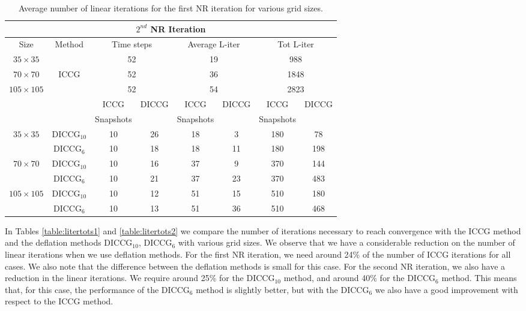 \documentclass[12pt]{article}
\begin{document}
\begin{table}[!h]\centering
\begin{minipage}{1\textwidth}
\vspace{-10pt}
\centering
\begin{tabular}{ |c|c|c|c|c|c|c|c|} 
  \hline
 \multicolumn{8}{|c|}{$2^{nd}$ NR Iteration}  \\
\hline
Size&Method&  \multicolumn{2}{|c|}{Time steps} &\multicolumn{2}{|c|}{Average L-iter} & \multicolumn{2}{|c|}{Tot L-iter}\\
\hline
$35\times35$& &\multicolumn{2}{|c|}{52} & \multicolumn{2}{|c|}{19}& \multicolumn{2}{|c|}{988} \\

$70\times70$&ICCG&\multicolumn{2}{|c|}{52}& \multicolumn{2}{|c|}{36}& \multicolumn{2}{|c|}{1848}\\

$105\times105$& & \multicolumn{2}{|c|}{52} &\multicolumn{2}{|c|}{54} & \multicolumn{2}{|c|}{2823}\\
\hline
&&ICCG&DICCG&ICCG&DICCG&ICCG&DICCG\\
&&Snapshots&&Snapshots&&Snapshots&\\
\hline
$35\times35$&DICCG$_{10}$&10&26&18&3&180&78 \\
&DICCG$_6$&10&18&18&11&180&198 \\
\hline
$70\times70$&DICCG$_{10}$ &10&16&37&9&370&144 \\
&DICCG$_6$ &10&21&37&23&370&483\\
\hline
$105\times105$&DICCG$_{10}$ &10&12&51&15&510&180 \\
&DICCG$_6$&10&13&51&36&510&468 \\
\hline
 \end{tabular}
\caption{Average number of linear iterations for the first NR iteration for various grid sizes.}\label{table:liters2}
\end{minipage}
\end{table}

In Tables \ref{table:litertots1} and \ref{table:litertots2} we compare the number of iterations necessary to reach convergence with the ICCG method and the deflation methods DICCG$_{10}$, DICCG$_6$ with various grid sizes. We observe that we have a considerable reduction on the number of linear iterations when we use deflation methods. For the first NR iteration, we need around 24\% of the number of ICCG iterations for all cases. We also note that the difference between the deflation methods is small for this case. For the second NR iteration, we also have a reduction in the linear iterations. We require around 25\% for the DICCG$_{10}$ method, and around 40\% for the DICCG$_6$ method. This means that, for this case, the performance of the DICCG$_6$ method is slightly better, but with the DICCG$_6$ we also have a good improvement with respect to the ICCG method.   \\ \\
\end{document}
